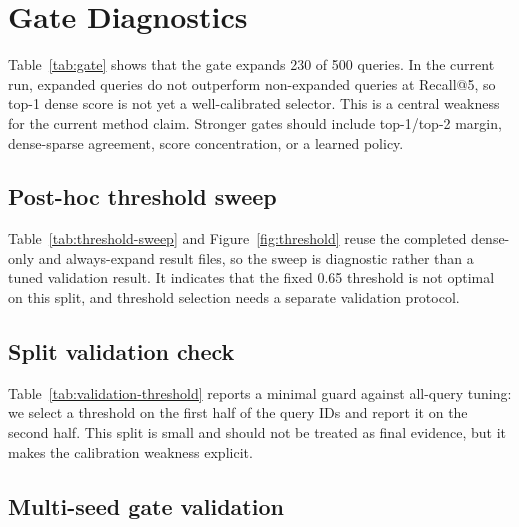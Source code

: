\documentclass[10pt]{article}
\begin{document}
\section{Gate Diagnostics}
\begin{table}[!tbp]
\caption{Seed-42 gate diagnostic split by expansion decision.}
\label{tab:gate}
\centering
\small

\end{table}

Table~\ref{tab:gate} shows that the gate expands 230 of
500 queries. In the current run, expanded queries do not
outperform non-expanded queries at Recall@5, so top-1 dense score is not yet a
well-calibrated selector. This is a central weakness for the current method claim.
Stronger gates should include
top-1/top-2 margin, dense-sparse agreement, score concentration, or a learned
policy.

\subsection{Post-hoc threshold sweep}
\begin{table}[!tbp]
\caption{Seed-42 post-hoc threshold sweep.}
\label{tab:threshold-sweep}
\centering
\small

\end{table}

Table~\ref{tab:threshold-sweep} and Figure~\ref{fig:threshold} reuse the
completed dense-only and always-expand result files, so the sweep is
diagnostic rather than a tuned validation result. It indicates that the fixed
0.65 threshold is not optimal on this split, and threshold selection needs a
separate validation protocol.

\subsection{Split validation check}
\begin{table}[!tbp]
\caption{Seed-42 split validation check for threshold selection.}
\label{tab:validation-threshold}
\centering
\scriptsize

\end{table}

Table~\ref{tab:validation-threshold} reports a minimal guard against all-query
tuning: we select a threshold on the first half of the query IDs and report it on the second half. This split is small and
should not be treated as final evidence, but it makes the calibration weakness
explicit.

\subsection{Multi-seed gate validation}
\begin{table}[!tbp]
\caption{Held-out gate validation over independent memory-index seeds.}
\label{tab:multiseed-gate}
\centering
\scriptsize

\end{table}
\end{document}
